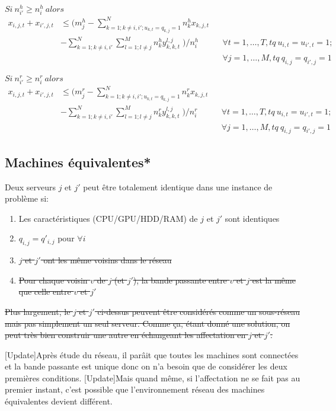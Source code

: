 \documentclass[twoside,fleqn]{EPURapport}
\begin{document}
$Si\ n^h_{i\prime}\geq n^h_{i}\ alors\;$
\begin{align}
x_{i,j,t}+x_{i\prime,j,t} &\leq (m^h_j-\sum^N_{k=1;k\neq{i},i\prime;u_{k,t}= q_{k,j}=1}{n^h_kx_{k,j,t}} \nonumber \\
 & - \sum^N_{k=1; k\neq{i},i\prime}{\sum^M_{l=1;l\neq{j}}{n^h_ky^{l,j}_{k,k,t}} }\;)/n^h_i        &&\forall t=1,\ldots,T, tq\ u_{i,t}=u_{i\prime,t}=1;  \nonumber \\
 & &&\forall j=1, \ldots, M, tq\ q_{i,j}=q_{i\prime,j}=1
\end{align}

$Si\ n^r_{i\prime}\geq n^r_{i}\ alors\;$
\begin{align}
x_{i,j,t}+x_{i\prime,j,t} &\leq (m^r_j-\sum^N_{k=1;k\neq{i},i\prime;u_{k,t}= q_{k,j}=1}{n^r_kx_{k,j,t}} \nonumber \\
 & - \sum^N_{k=1; k\neq{i},i\prime}{\sum^M_{l=1;l\neq{j}}{n^r_ky^{l,j}_{k,k,t}} }\;)/n^r_i        &&\forall t=1,\ldots,T, tq\ u_{i,t}=u_{i\prime,t}=1;  \nonumber \\
 & &&\forall j=1, \ldots, M, tq\ q_{i,j}=q_{i\prime,j}=1
\end{align}


\subsection{Machines équivalentes*}
Deux serveurs $j$ et $j'$ peut être totalement identique dans une instance de problème si:
\begin{enumerate}
\item Les caractéristiques (CPU/GPU/HDD/RAM) de $j$ et $j'$ sont identiques
\item $q_{i,j} = q'_{i,j}$ pour $\forall i$
\item \sout{$j$ et $j'$ ont les même voisins dans le réseau}
\item \sout{Pour chaque voisin $v$ de $j$ (et $j'$), la bande passante entre $v$ et $j$ est la même que celle entre $v$ et $j'$}
\end{enumerate}
\bigskip
\sout{Plus largement, le $j$ et $j'$ ci-dessus peuvent être considérés comme un sous-réseau mais pas simplement un seul serveur. Comme ça, étant donné une solution, on peut très bien construir une autre en échangeant les affectation en $j$ et $j'$.}

[Update]Après étude du réseau, il parâit que toutes les machines sont connectées et la bande passante est unique donc on n'a besoin que de considérer les deux premières conditions. [Update]Mais quand même, si l'affectation ne se fait pas au premier instant, c'est possible que l'environnement réseau des machines équivalentes devient différent.
\end{document}
